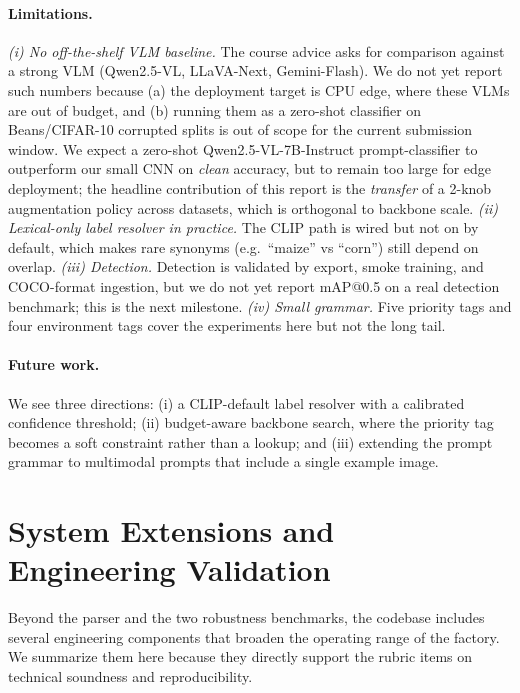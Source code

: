 \documentclass[10pt,twocolumn,letterpaper]{article}
\begin{document}
\paragraph{Limitations.}
\textit{(i) No off-the-shelf VLM baseline.}
The course advice asks for comparison against a strong VLM
(Qwen2.5-VL, LLaVA-Next, Gemini-Flash). We do not yet report such
numbers because (a) the deployment target is CPU edge, where these
VLMs are out of budget, and (b) running them as a zero-shot
classifier on Beans/CIFAR-10 corrupted splits is out of scope for
the current submission window. We expect a zero-shot
Qwen2.5-VL-7B-Instruct prompt-classifier to outperform our small
CNN on \emph{clean} accuracy, but to remain too large for
edge deployment; the headline contribution of this report is the
\emph{transfer} of a 2-knob augmentation policy across datasets,
which is orthogonal to backbone scale.
\textit{(ii) Lexical-only label resolver in practice.}
The CLIP path is wired but not on by default, which makes rare
synonyms (e.g.\ ``maize'' vs ``corn'') still depend on overlap.
\textit{(iii) Detection.}
Detection is validated by export, smoke training, and COCO-format
ingestion, but we do not yet report mAP@0.5 on a real detection
benchmark; this is the next milestone.
\textit{(iv) Small grammar.} Five priority tags and four
environment tags cover the experiments here but not the long tail.
\paragraph{Future work.}
We see three directions: (i) a CLIP-default label resolver with a
calibrated confidence threshold; (ii) budget-aware backbone search,
where the priority tag becomes a soft constraint rather than a
lookup; and (iii) extending the prompt grammar to multimodal
prompts that include a single example image.

\section{System Extensions and Engineering Validation}
\label{sec:engineering}
Beyond the parser and the two robustness benchmarks, the codebase
includes several engineering components that broaden the operating
range of the factory. We summarize them here because they directly
support the rubric items on technical soundness and reproducibility.
\end{document}
